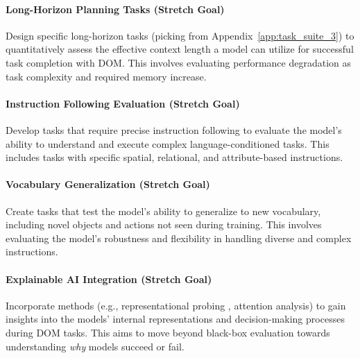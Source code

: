 \paragraph{\textbf{Long-Horizon Planning Tasks} (Stretch Goal)} 
Design specific long-horizon tasks (picking from Appendix~\ref{app:task_suite_3}) to quantitatively assess the effective context length a model can utilize for successful task completion with DOM. This involves evaluating performance degradation as task complexity and required memory increase.

\paragraph{\textbf{Instruction Following Evaluation} (Stretch Goal)} 
Develop tasks that require precise instruction following to evaluate the model's ability to understand and execute complex language-conditioned tasks. This includes tasks with specific spatial, relational, and attribute-based instructions.

\paragraph{\textbf{Vocabulary Generalization} (Stretch Goal)} Create tasks that test the model's ability to generalize to new vocabulary, including novel objects and actions not seen during training. This involves evaluating the model's robustness and flexibility in handling diverse and complex instructions.

\paragraph{\textbf{Explainable AI Integration} (Stretch Goal) } Incorporate methods (e.g., representational probing \cite{Probing-VLA}, attention analysis) to gain insights into the models' internal representations and decision-making processes during DOM tasks. This aims to move beyond black-box evaluation towards understanding \textit{why} models succeed or fail.


